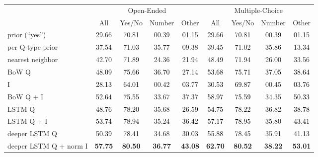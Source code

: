 \begin{table}[t] \scriptsize
\setlength{\tabcolsep}{1.8pt}
\begin{center}
\begin{tabular}{@{} l  c  c  c  c  c  c c c@{}}
\toprule
& \multicolumn{4}{c}{Open-Ended} & \multicolumn{4}{c}{ Multiple-Choice} \\

\cmidrule[0.75pt](l){2-5}
\cmidrule[0.75pt](l){6-9}
 & All & Yes/No & Number & Other & All & Yes/No & Number & Other \\
\midrule
prior (``yes'') & 29.66 & 70.81 & 00.39 & 01.15 & 29.66 & 70.81 & 00.39 & 01.15 \\
per Q-type prior & 37.54 & 71.03 & 35.77 & 09.38 &  39.45 & 71.02 & 35.86 & 13.34 \\
nearest neighbor & 42.70 & 71.89 & 24.36 & 21.94 & 48.49 & 71.94 & 26.00 & 33.56 \\
BoW Q & \textcolor{black}{48.09} & \textcolor{black}{75.66} &  \textcolor{black}{36.70}& \textcolor{black}{27.14} 
& \textcolor{black}{53.68} & \textcolor{black}{75.71} & \textcolor{black}{37.05} & \textcolor{black}{38.64}\\
I & \textcolor{black}{28.13} & \textcolor{black}{64.01} & 00.42 & \textcolor{black}{03.77}  
&\textcolor{black}{30.53} & \textcolor{black}{69.87} & 00.45 & \textcolor{black}{03.76}\\
BoW Q + I & \textcolor{black}{52.64} & \textcolor{black}{75.55} & 33.67 & \textcolor{black}{37.37} 
& \textcolor{black}{58.97} & \textcolor{black}{75.59} & 34.35 & \textcolor{black}{50.33}\\
LSTM Q & \textcolor{black}{48.76} & \textcolor{black}{78.20} & 35.68 & \textcolor{black}{26.59} 
& \textcolor{black}{54.75} & \textcolor{black}{78.22} & 36.82 &\textcolor{black}{38.78}\\
LSTM Q + I & \textcolor{black}{53.74} & \textcolor{black}{78.94} & 35.24 & \textcolor{black}{36.42} 
& \textcolor{black}{57.17} & \textcolor{black}{78.95}& 35.80 & \textcolor{black}{43.41}\\
deeper LSTM Q & \textcolor{black}{50.39} & \textcolor{black}{78.41} & 34.68 & \textcolor{black}{30.03} 
& \textcolor{black}{55.88} & \textcolor{black}{78.45} & 35.91 &\textcolor{black}{41.13}\\
deeper LSTM Q + norm I & \textbf{57.75} & \textbf{80.50} & \textbf{36.77} & \textbf{43.08} 
& \textbf{62.70} & \textbf{80.52}& \textbf{38.22} & \textbf{53.01}\\

\end{tabular}
\end{center}
\end{table}
